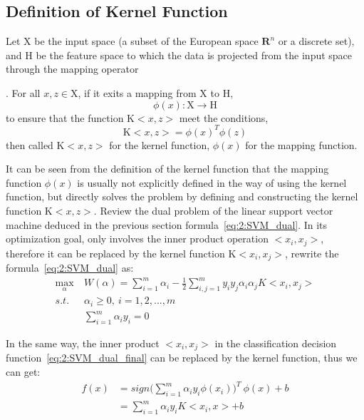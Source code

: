 \documentclass[master]{IPSstyle}
\begin{document}
\subsection{Definition of Kernel Function}
Let $\mathrm{X}$ be the input space (a subset of the European space $\mathbf{R}^n$ or a discrete set), and $\mathrm{H}$ be the feature space to which the data is projected from the input space through the mapping operator~\cite{scholkopf2001learning}{. For all $x, z \in \mathrm{X}$, if it exits a mapping from $\mathrm{X}$ to $\mathrm{H}$, 
\begin{equation}
\phi(x): \mathrm{X} \to \mathrm{H}
\end{equation}
to ensure that the function $\mathrm{K}<x, z>$ meet the conditions,
\begin{equation}
\mathrm{K}<x, z> = \phi(x)^T\phi(z)
\end{equation}
then called $\mathrm{K}<x, z>$ for the kernel function, $\phi(x)$ for the mapping function.

It can be seen from the definition of the kernel function that the mapping function $\phi(x)$ is usually not explicitly defined in the way of using the kernel function, but directly solves the problem by defining and constructing the kernel function $\mathrm{K}<x,z>$. Review the dual problem of the linear support vector machine deduced in the previous section formula~\ref{eq:2:SVM_dual}. In its optimization goal, only involves the inner product operation $<x_i, x_j>$, therefore it can be replaced by the kernel function $\mathrm{K}<x_i, x_j>$, rewrite the formula~\ref{eq:2:SVM_dual} as:
\begin{equation}\label{eq:2:SVM_dual_Kernel}
\begin{aligned}
\max_{\alpha} ~ &W(\alpha) = \sum_{i=1}^{m}\alpha_i - \frac{1}{2}\sum_{i, j=1}^{m}y_iy_j\alpha_i\alpha_jK<x_i, x_j>\\
s.t. ~ &\alpha_i \geq 0, ~ i = 1,2,...,m\\
&\sum_{i=1}^{m}\alpha_iy_i = 0 
\end{aligned}
\end{equation}

In the same way, the inner product $<x_i, x_j>$ in the classification decision function~\ref{eq:2:SVM_dual_final} can be replaced by the kernel function, thus we can get:
\begin{equation}
\begin{aligned}
f(x) &= sign\Big(\sum_{i=1}^m\alpha_iy_i\phi(x_i)\Big)^T ~ \phi(x) + b \\
      & = \sum_{i=1}^m\alpha_iy_i K<x_i,x> + b
\end{aligned}
\end{equation}

}
\end{document}
